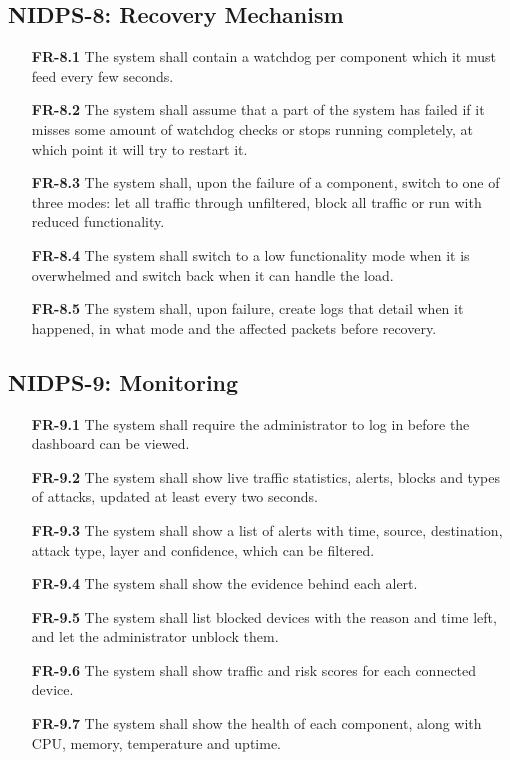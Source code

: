 \subsection{NIDPS-8: Recovery Mechanism}\label{sec:4.2.8}

\begin{itemize}[leftmargin=4.4em,labelwidth=3.9em,labelsep=0.5em,align=left]
\item[\hypertarget{req:FR-8.1}{\textbf{FR-8.1}}] The system shall contain a watchdog per component which it must feed every few seconds.
\item[\hypertarget{req:FR-8.2}{\textbf{FR-8.2}}] The system shall assume that a part of the system has failed if it misses some amount of watchdog checks or stops running completely, at which point it will try to restart it.
\item[\hypertarget{req:FR-8.3}{\textbf{FR-8.3}}] The system shall, upon the failure of a component, switch to one of three modes: let all traffic through unfiltered, block all traffic or run with reduced functionality.
\item[\hypertarget{req:FR-8.4}{\textbf{FR-8.4}}] The system shall switch to a low functionality mode when it is overwhelmed and switch back when it can handle the load.
\item[\hypertarget{req:FR-8.5}{\textbf{FR-8.5}}] The system shall, upon failure, create logs that detail when it happened, in what mode and the affected packets before recovery.
\end{itemize}

\subsection{NIDPS-9: Monitoring}\label{sec:4.2.9}

\begin{itemize}[leftmargin=4.4em,labelwidth=3.9em,labelsep=0.5em,align=left]
\item[\hypertarget{req:FR-9.1}{\textbf{FR-9.1}}] The system shall require the administrator to log in before the dashboard can be viewed.
\item[\hypertarget{req:FR-9.2}{\textbf{FR-9.2}}] The system shall show live traffic statistics, alerts, blocks and types of attacks, updated at least every two seconds.
\item[\hypertarget{req:FR-9.3}{\textbf{FR-9.3}}] The system shall show a list of alerts with time, source, destination, attack type, layer and confidence, which can be filtered.
\item[\hypertarget{req:FR-9.4}{\textbf{FR-9.4}}] The system shall show the evidence behind each alert.
\item[\hypertarget{req:FR-9.5}{\textbf{FR-9.5}}] The system shall list blocked devices with the reason and time left, and let the administrator unblock them.
\item[\hypertarget{req:FR-9.6}{\textbf{FR-9.6}}] The system shall show traffic and risk scores for each connected device.
\item[\hypertarget{req:FR-9.7}{\textbf{FR-9.7}}] The system shall show the health of each component, along with CPU, memory, temperature and uptime.
\end{itemize}

